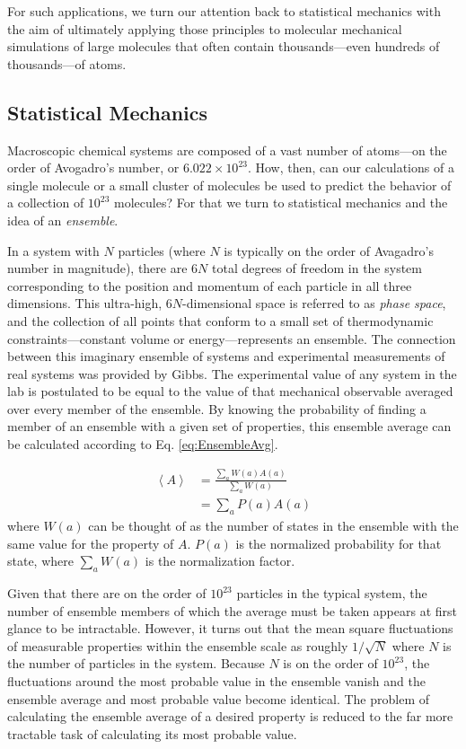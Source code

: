 For such applications, we turn our attention back to statistical mechanics with
the aim of ultimately applying those principles to molecular mechanical
simulations of large molecules that often contain thousands---even hundreds of
thousands---of atoms.

\subsection{Statistical Mechanics}

Macroscopic chemical systems are composed of a vast number of atoms---on the
order of Avogadro's number, or $6.022 \times 10 ^ {23}$. How, then, can our
calculations of a single molecule or a small cluster of molecules be used to
predict the behavior of a collection of $10 ^ {23}$ molecules? For that we turn
to statistical mechanics and the idea of an \emph{ensemble}.

In a system with $N$ particles (where $N$ is typically on the order of
Avagadro's number in magnitude), there are $6 N$ total degrees of freedom in the
system corresponding to the position and momentum of each particle in all three
dimensions. This ultra-high, $6N$-dimensional space is referred to as
\emph{phase space}, and the collection of all points that conform to a small set
of thermodynamic constraints---\eg constant volume or energy---represents an
ensemble. \cite{McQuarrie_Book_StatMech_1973} The connection between this
imaginary ensemble of systems and experimental measurements of real systems was
provided by Gibbs. The experimental value of any system in the lab is postulated
to be equal to the value of that mechanical observable averaged over every
member of the ensemble. \cite{McQuarrie_Book_StatMech_1973} By knowing the
probability of finding a member of an ensemble with a given set of properties,
this ensemble average can be calculated according to Eq. \ref{eq:EnsembleAvg}.

\begin{align}
   \left < A \right > & = \frac {\sum_a W(a) A(a)} {\sum_a W(a)} \nonumber \\
                      & = \sum_a P(a) A(a)
   \label{eq:EnsembleAvg}
\end{align}
where $W(a)$ can be thought of as the number of states in the ensemble with the
same value for the property of $A$. $P(a)$ is the normalized probability for
that state, where $\sum_a W(a)$ is the normalization factor.

Given that there are on the order of $10^{23}$ particles in the typical system,
the number of ensemble members of which the average must be taken appears at
first glance to be intractable. However, it turns out that the mean square
fluctuations of measurable properties within the ensemble scale as roughly $1 /
\sqrt{N}$ where $N$ is the number of particles in the system.  Because $N$ is on
the order of $10 ^ {23}$, the fluctuations around the most probable value in the
ensemble vanish and the ensemble average and most probable value become
identical. The problem of calculating the ensemble average of a desired property
is reduced to the far more tractable task of calculating its most probable
value.

